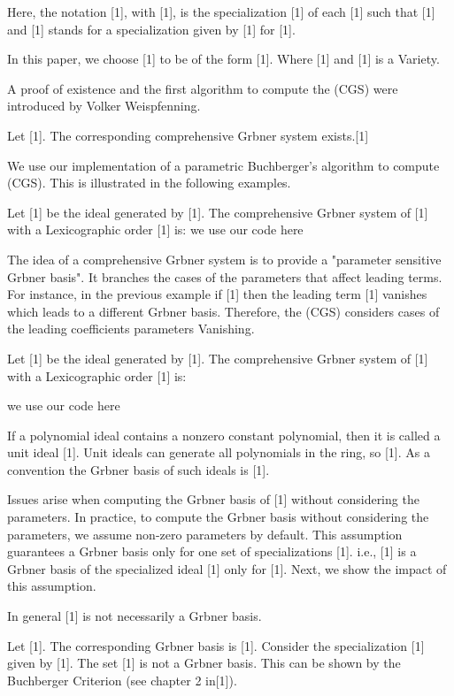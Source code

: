 \documentclass{article}
\begin{document}
{Here, the notation [1], with [1], is the specialization [1]
of each [1] such that  [1]
and  [1] stands for a specialization given by [1] 
for [1].

In this paper, we choose [1] to be of the form 
[1].
Where [1] and [1] is a Variety.

A proof of existence and the first algorithm to compute the (CGS) were introduced by Volker Weispfenning.

    Let [1]. The corresponding comprehensive Gr{}bner system exists.[1]

We use our implementation of a parametric Buchberger's algorithm to compute (CGS). 
This is illustrated in the following examples.

    Let [1] be the ideal generated by 
    [1].
    The comprehensive Gr{}bner system of [1] with a Lexicographic order [1] is:
    {  we use our code here}

The idea of a comprehensive Gr{}bner system is to provide a "parameter sensitive Gr{}bner basis".
It branches the cases of the parameters that affect leading terms. For instance, in the previous
example if [1] then the leading term [1] vanishes which leads to a different Gr{}bner basis. Therefore,
the (CGS) considers cases of the leading coefficients parameters Vanishing.


    Let [1] be the ideal generated by 
    [1].
    The comprehensive Gr{}bner system of [1] with a Lexicographic order [1] is:
    
    {  we use our code here}



    If a polynomial ideal contains a nonzero constant polynomial, then it is called a unit ideal [1].
   Unit ideals can generate all polynomials in the ring, so [1].
    As a convention the Gr{}bner basis of such ideals is [1].

   
Issues arise when computing the Gr{}bner basis of [1] without considering the parameters.
In practice, to compute the Gr{}bner basis without considering the parameters, we assume non-zero parameters by default.
This assumption guarantees a Gr{}bner basis only for one set of specializations [1]. i.e., 
[1] is a Gr{}bner basis of the specialized ideal [1] only for [1].
Next, we show the impact of this assumption.

     In general [1] is not necessarily a Gr{}bner basis.
    
        
        Let [1]. The corresponding Gr{}bner basis 
           is [1]. Consider 
           the specialization [1] given by [1].
           The set [1] is not a Gr{}bner basis.
		   This can be shown by the Buchberger Criterion (see chapter 2 in[1]).

}
\end{document}
